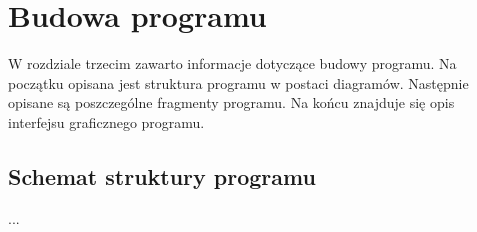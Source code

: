 \chapter{Budowa programu}
W rozdziale trzecim zawarto informacje dotyczące budowy programu. Na początku opisana jest struktura programu w postaci diagramów. Następnie opisane są poszczególne fragmenty programu. Na końcu znajduje się opis interfejsu graficznego programu.

\section{Schemat struktury programu}
...